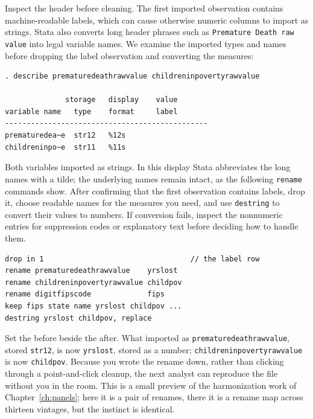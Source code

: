 Inspect the header before cleaning. The first imported observation contains machine-readable labels, which can cause otherwise numeric columns to import as strings. Stata also converts long header phrases such as \texttt{Premature Death raw value} into legal variable names. We examine the imported types and names before dropping the label observation and converting the measures:
\par
{\footnotesize
\begin{verbatim}
. describe prematuredeathrawvalue childreninpovertyrawvalue

              storage   display    value
variable name   type    format     label
-----------------------------------------------
prematuredea~e  str12   %12s
childreninpo~e  str11   %11s
\end{verbatim}
}
Both variables imported as strings. In this display Stata abbreviates the long names with a tilde; the underlying names remain intact, as the following \texttt{rename} commands show. After confirming that the first observation contains labels, drop it, choose readable names for the measures you need, and use \texttt{destring} to convert their values to numbers. If conversion fails, inspect the nonnumeric entries for suppression codes or explanatory text before deciding how to handle them.
\par
{\footnotesize
\begin{verbatim}
drop in 1                                  // the label row
rename prematuredeathrawvalue    yrslost
rename childreninpovertyrawvalue childpov
rename digitfipscode             fips
keep fips state name yrslost childpov ...
destring yrslost childpov, replace
\end{verbatim}
}
Set the before beside the after. What imported as \texttt{premature\allowbreak death\allowbreak raw\allowbreak value}, stored \texttt{str12}, is now \texttt{yrslost}, stored as a number; \texttt{childrenin\allowbreak poverty\allowbreak raw\allowbreak value} is now \texttt{childpov}. Because you wrote the rename down, rather than clicking through a point-and-click cleanup, the next analyst can reproduce the file without you in the room. This is a small preview of the harmonization work of Chapter~\ref{ch:panels}; here it is a pair of renames, there it is a rename map across thirteen vintages, but the instinct is identical.

